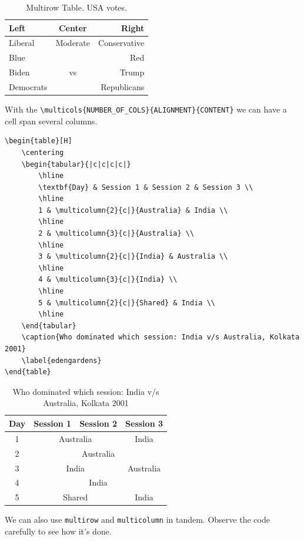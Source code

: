 \documentclass{article}
\theoremstyle{remark}
\begin{document}
    \begin{table}[H]
        \centering
        \begin{tabular}{l|c|r}
            \hline
            \textbf{Left} & \textbf{Center} & \textbf{Right} \\
            \hline
            Liberal & Moderate & Conservative \\
            Blue & \multirow{3}{*}{vs} & Red \\
            Biden &  & Trump \\
            Democrats & & Republicans \\
            \hline
        \end{tabular}
        \caption{Multirow Table. USA votes.}
    \end{table}
    With the \verb!\multicols{NUMBER_OF_COLS}{ALIGNMENT}{CONTENT}! we can have a cell span
    several columns.
\begin{lstlisting}
\begin{table}[H]
    \centering
    \begin{tabular}{|c|c|c|c|}
        \hline
        \textbf{Day} & Session 1 & Session 2 & Session 3 \\
        \hline 
        1 & \multicolumn{2}{c|}{Australia} & India \\
        \hline
        2 & \multicolumn{3}{c|}{Australia} \\
        \hline
        3 & \multicolumn{2}{c|}{India} & Australia \\
        \hline
        4 & \multicolumn{3}{c|}{India} \\
        \hline 
        5 & \multicolumn{2}{c|}{Shared} & India \\
        \hline
    \end{tabular}
    \caption{Who dominated which session: India v/s Australia, Kolkata 2001}
    \label{edengardens}
\end{table}

\end{lstlisting}
    
    \begin{table}[H]
        \centering
        \begin{tabular}{|c|c|c|c|}
            \hline
            \textbf{Day} & Session 1 & Session 2 & Session 3 \\
            \hline 
            1 & \multicolumn{2}{c|}{Australia} & India \\
            \hline
            2 & \multicolumn{3}{c|}{Australia} \\
            \hline
            3 & \multicolumn{2}{c|}{India} & Australia \\
            \hline
            4 & \multicolumn{3}{c|}{India} \\
            \hline 
            5 & \multicolumn{2}{c|}{Shared} & India \\
            \hline
        \end{tabular}
        \caption{Who dominated which session: India v/s Australia, Kolkata 2001}
        \label{edengardens}
    \end{table}
    We can also use \verb!multirow! and \verb!multicolumn! in tandem. Observe the code
    carefully to see how it's done.
\end{document}
